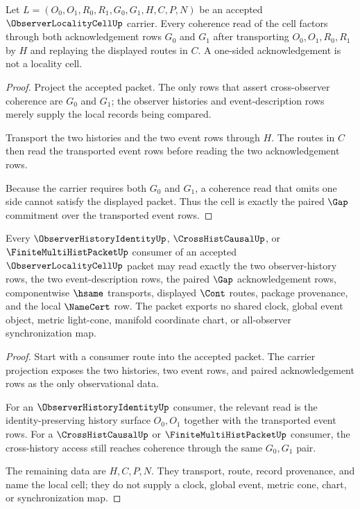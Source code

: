 \begin{theorem}
\label{thm:observer-locality-cell-gap-coherence}
Let $L=(O_0,O_1,R_0,R_1,G_0,G_1,H,C,P,N)$ be an accepted $\ObserverLocalityCellUp$ carrier. Every coherence read of the cell factors through both acknowledgement rows $G_0$ and $G_1$ after transporting $O_0,O_1,R_0,R_1$ by $H$ and replaying the displayed routes in $C$. A one-sided acknowledgement is not a locality cell.
\end{theorem}
\begin{proof}
Project the accepted packet. The only rows that assert cross-observer coherence are $G_0$ and $G_1$; the observer histories and event-description rows merely supply the local records being compared.

Transport the two histories and the two event rows through $H$. The routes in $C$ then read the transported event rows before reading the two acknowledgement rows.

Because the carrier requires both $G_0$ and $G_1$, a coherence read that omits one side cannot satisfy the displayed packet. Thus the cell is exactly the paired $\Gap$ commitment over the transported event rows.
\end{proof}

\begin{theorem}
\label{thm:observer-locality-cell-consumer-boundary}
Every $\ObserverHistoryIdentityUp$, $\CrossHistCausalUp$, or $\FiniteMultiHistPacketUp$ consumer of an accepted $\ObserverLocalityCellUp$ packet may read exactly the two observer-history rows, the two event-description rows, the paired $\Gap$ acknowledgement rows, componentwise $\hsame$ transports, displayed $\Cont$ routes, package provenance, and the local $\NameCert$ row. The packet exports no shared clock, global event object, metric light-cone, manifold coordinate chart, or all-observer synchronization map.
\end{theorem}
\begin{proof}
Start with a consumer route into the accepted packet. The carrier projection exposes the two histories, two event rows, and paired acknowledgement rows as the only observational data.

For an $\ObserverHistoryIdentityUp$ consumer, the relevant read is the identity-preserving history surface $O_0,O_1$ together with the transported event rows. For a $\CrossHistCausalUp$ or $\FiniteMultiHistPacketUp$ consumer, the cross-history access still reaches coherence through the same $G_0,G_1$ pair.

The remaining data are $H,C,P,N$. They transport, route, record provenance, and name the local cell; they do not supply a clock, global event, metric cone, chart, or synchronization map.
\end{proof}

